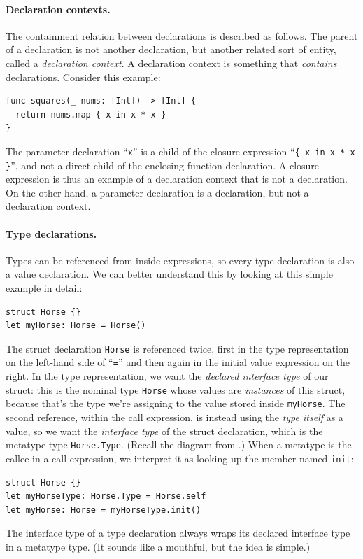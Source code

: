 \documentclass[../generics]{subfiles}
\begin{document}
\paragraph{Declaration contexts.}
The containment relation between declarations is described as follows. The parent of a declaration is not another declaration, but another related sort of entity, called a \emph{declaration context}. A declaration context is something that \emph{contains} declarations. Consider this example:
\begin{Verbatim}
func squares(_ nums: [Int]) -> [Int] {
  return nums.map { x in x * x }
}
\end{Verbatim}
The parameter declaration ``\texttt{x}'' is a child of the closure expression ``\verb|{ x in x * x }|'', and not a direct child of the enclosing function declaration. A closure expression is thus an example of a declaration context that is not a declaration. On the other hand, a parameter declaration is a declaration, but not a declaration context.

\paragraph{Type declarations.} Types can be referenced from inside expressions, so every type declaration is also a value declaration. We can better understand this by looking at this simple example in detail:
\begin{Verbatim}
struct Horse {}
let myHorse: Horse = Horse()
\end{Verbatim}
The struct declaration \texttt{Horse} is referenced twice, first in the type representation on the left-hand side of ``\texttt{=}'' and then again in the initial value expression on the right. In the type representation, we want the \emph{declared interface type} of our struct: this is the nominal type \texttt{Horse} whose values are \emph{instances} of this struct, because that's the type we're assigning to the value stored inside \texttt{myHorse}. The second reference, within the call expression, is instead using the \emph{type itself} as a value, so we want the \emph{interface type} of the struct declaration, which is the metatype type \texttt{Horse.Type}. (Recall the diagram from .) When a metatype is the callee in a call expression, we interpret it as looking up the member named \texttt{init}:
\begin{Verbatim}
struct Horse {}
let myHorseType: Horse.Type = Horse.self
let myHorse: Horse = myHorseType.init()
\end{Verbatim}
The interface type of a type declaration always wraps its declared interface type in a metatype type. (It sounds like a mouthful, but the idea is simple.)
\end{document}
